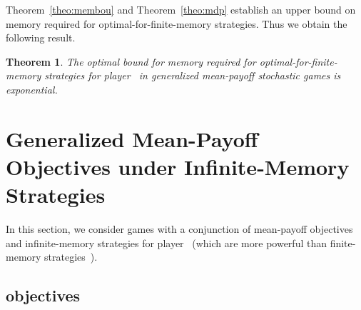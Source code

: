 \documentclass{article}
\newtheorem{theorem}{Theorem}
\begin{document}
\smallskip{} 
Theorem~\ref{theo:membou} and Theorem~\ref{theo:mdp} establish an  
upper bound on memory required for optimal-for-finite-memory strategies. 
Thus we obtain the following result.

\begin{theorem}\label{theo:memgenmean}
The optimal bound for memory required for optimal-for-finite-memory strategies for 
player~ in generalized mean-payoff stochastic games is exponential.
\end{theorem}



\begin{comment}
\smallskip\noindent{\em Lower bound dependent on weights.}
The family of examples in Lemma~\ref{lem:exponential} has unbounded number of states,
and unbounded dimension of the reward function. However, the rewards are bounded 
(in ). There exist games where the memory needed to win almost-surely
is exponential, but the number of states and the dimension are fixed. Thus the
memory depends exponentially only on the numbers in the reward function: in the
example of \figurename~\ref{fig:exponential-numbers}, player~ needs to stay
 times in  (resp., ) if previously player~ visited  (resp., ),
which requires exponential memory (as the number  is encoded in binary).


\smallskip\noindent{\bf Open question.}
The question whether exponential memory is sufficient for optimal-for-finite-memory 
strategies remains open.
Currently we do not have any explicit upper bound. 
\end{comment}






\section{Generalized Mean-Payoff Objectives under Infinite-Memory Strategies}\label{sec:infmem}

In this section, we consider games with a conjunction of mean-payoff objectives
and infinite-memory strategies for player~ (which are more powerful than 
finite-memory strategies~\cite[Lemma~7]{VCDHRR15}).








\subsection{ objectives}
\end{document}
